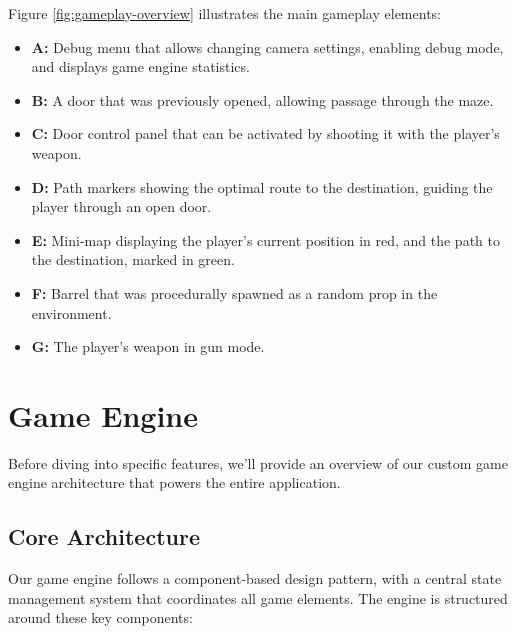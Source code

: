 \documentclass{article}
\begin{document}
Figure \ref{fig:gameplay-overview} illustrates the main gameplay elements:
\begin{itemize}
    \item \textbf{A:} Debug menu that allows changing camera settings, enabling debug mode, and displays game engine statistics.
    \item \textbf{B:} A door that was previously opened, allowing passage through the maze.
    \item \textbf{C:} Door control panel that can be activated by shooting it with the player's weapon.
    \item \textbf{D:} Path markers showing the optimal route to the destination, guiding the player through an open door.
    \item \textbf{E:} Mini-map displaying the player's current position in red,  and the path to the destination, marked in green.
    \item \textbf{F:} Barrel that was procedurally spawned as a random prop in the environment.
    \item \textbf{G:} The player's weapon in gun mode.
\end{itemize}


\section{Game Engine}
Before diving into specific features, we'll provide an overview of our custom game engine architecture that powers the entire application.

\subsection{Core Architecture}
Our game engine follows a component-based design pattern, with a central state management system that coordinates all game elements. The engine is structured around these key components:
\end{document}
